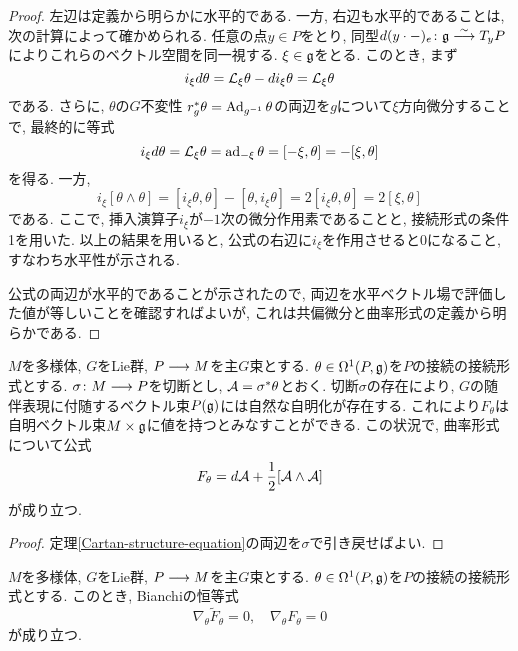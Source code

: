 \begin{proof}
左辺は定義から明らかに水平的である.
一方, 右辺も水平的であることは, 次の計算によって確かめられる.
任意の点$y \in P$をとり,
同型$d(y \cdot -)_e \colon \mathfrak{g} \stackrel{\sim}{\longrightarrow} T_yP$によりこれらのベクトル空間を同一視する.
$\xi \in \mathfrak{g}$をとる.
このとき, まず
\begin{equation}
i_\xi d\theta = \mathcal{L}_\xi \theta - d i_\xi \theta
= \mathcal{L}_\xi \theta
\end{equation}
である.
さらに, $\theta$の$G$不変性
$r_g^* \theta = \operatorname{Ad}_{g^{-1}}\theta$の両辺を$g$について$\xi$方向微分することで, 最終的に等式
\begin{equation}
  i_\xi d\theta = \mathcal{L}_\xi \theta = \operatorname{ad}_{-\xi} \theta = [-\xi, \theta] = -[\xi, \theta]
\end{equation}
を得る.
一方,
\begin{equation}
  i_\xi [\theta \wedge \theta]
  = [i_\xi \theta, \theta] - [\theta, i_\xi \theta]
  = 2[i_\xi \theta, \theta] = 2[\xi, \theta]
\end{equation}
である.
ここで, 挿入演算子$i_\xi$が$-1$次の微分作用素であることと,
接続形式の条件1を用いた.
以上の結果を用いると, 公式の右辺に$i_\xi$を作用させると$0$になること, すなわち水平性が示される.

公式の両辺が水平的であることが示されたので, 両辺を水平ベクトル場で評価した値が等しいことを確認すればよいが, これは共偏微分と曲率形式の定義から明らかである.
\end{proof}

\begin{thm}
  $M$を多様体, $G$をLie群, $P \longrightarrow M$を主$G$束とする.
  $\theta \in \Omega^1(P, \mathfrak{g})$を$P$の接続の接続形式とする.
  $\sigma \colon M \longrightarrow P$を切断とし,
  $\mathcal{A} = \sigma^*\theta$とおく.
  切断$\sigma$の存在により, $G$の随伴表現に付随するベクトル束$P(\mathfrak{g})$には自然な自明化が存在する.
  これにより$F_\theta$は自明ベクトル束$M \times \mathfrak{g}$に値を持つとみなすことができる.
  この状況で, 曲率形式について公式
\begin{equation}
  F_\theta = d\mathcal{A} + \frac{1}{2}[\mathcal{A} \wedge \mathcal{A}]
\end{equation}
が成り立つ.
\end{thm}

\begin{proof}
定理\ref{Cartan-structure-equation}の両辺を$\sigma$で引き戻せばよい.
\end{proof}

\begin{thm}
  $M$を多様体, $G$をLie群, $P \longrightarrow M$を主$G$束とする.
  $\theta \in \Omega^1(P, \mathfrak{g})$を$P$の接続の接続形式とする.
このとき, Bianchiの恒等式
\begin{equation}
\nabla_\theta \widetilde{F}_\theta = 0, \quad
\nabla_\theta F_\theta = 0
\end{equation}
が成り立つ.
\end{thm}

